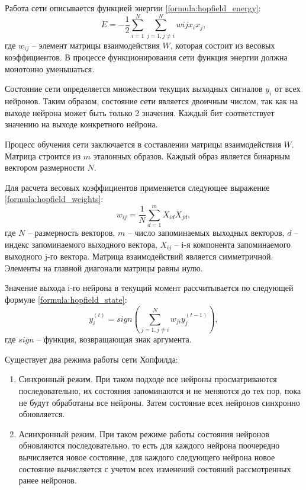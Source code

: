 Работа сети описывается функцией энергии \ref{formula:hopfield_energy}:
\begin{equation}\label{formula:hopfield_energy}
	E = -\frac{1}{2}\sum\limits_{i=1}^{N}\sum\limits_{j=1,j\neq i}^{N}w{ij}x_i x_j,
\end{equation}
где $w_{ij}$ -- элемент матрицы взаимодействия $W$, которая состоит из весовых коэффициентов.
В процессе функционирования сети функция энергии должна монотонно уменьшаться.

Состояние сети определяется множеством текущих выходных сигналов $y_i$ от всех нейронов.
Таким образом, состояние сети является двоичным числом, так как на выходе нейрона может быть только 2 значения.
Каждый бит соответствует значению на выходе конкретного нейрона.

Процесс обучения сети заключается в составлении матрицы взаимодействия $W$.
Матрица строится из $m$ эталонных образов.
Каждый образ является бинарным вектором размерности $N$.

Для расчета весовых коэффициентов применяется следующее выражение \ref{formula:hopfield_weights}:
\begin{equation}\label{formula:hopfield_weights}
	w_{ij} = \frac{1}{N}\sum\limits_{d=1}^{m}X_{id}X_{jd},
\end{equation}
где $N$ -- размерность векторов, $m$ -- число запоминаемых выходных векторов, $d$ -- индекс запоминаемого выходного вектора, $X_{ij}$ -- i-я компонента запоминаемого выходного j-го вектора.
Матрица взаимодействий является симметричной.
Элементы на главной диагонали матрицы равны нулю.

Значение выхода i-го нейрона в текущий момент рассчитывается по следующей формуле \ref{formula:hopfield_state}:
\begin{equation}\label{formula:hopfield_state}
	y_i^{(t)} = sign(\sum\limits_{j=1, j \neq i}^{N}w_{ji}y_j^{(t-1)}),
\end{equation}
где $sign$ -- функция, возвращающая знак аргумента.

Существует два режима работы сети Хопфилда:
\begin{enumerate}
	\item Синхронный режим. При таком подходе все нейроны просматриваются последовательно, их состояния запоминаются и не меняются до тех пор, пока не будут обработаны все нейроны. Затем состояние всех нейронов синхронно обновляется.
	\item Асинхронный режим. При таком режиме работы состояния нейронов обновляются последовательно, то есть для каждого нейрона поочередно вычисляется новое состояние, для каждого следующего нейрона новое состояние вычисляется с учетом всех изменений состояний рассмотренных ранее нейронов.
\end{enumerate}

